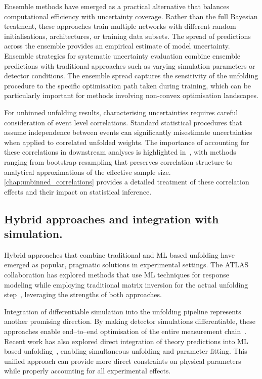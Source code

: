     Ensemble methods have emerged as a practical alternative that balances computational efficiency with uncertainty coverage.
    Rather than the full Bayesian treatment, these approaches train multiple networks with different random initialisations, architectures, or training data subsets.
    The spread of predictions across the ensemble provides an empirical estimate of model uncertainty.
    Ensemble strategies for systematic uncertainty evaluation combine ensemble predictions with traditional approaches such as varying simulation parameters or detector conditions.
    The ensemble spread captures the sensitivity of the unfolding procedure to the specific optimisation path taken during training, which can be particularly important for methods involving non-convex optimisation landscapes.

    For unbinned unfolding results, characterising uncertainties requires careful consideration of event level correlations.
    Standard statistical procedures that assume independence between events can significantly misestimate uncertainties when applied to correlated unfolded weights.
     The importance of accounting for these correlations in downstream analyses is highlighted in~\cite{Desai:2025mpy}, with methods ranging from bootstrap resampling that preserves correlation structure to analytical approximations of the effective sample size.
    \cref{chap:unbinned_correlations} provides a detailed treatment of these correlation effects and their impact on statistical inference.

\subsection{Hybrid approaches and integration with simulation.}

    Hybrid approaches that combine traditional and ML based unfolding have emerged as popular, pragmatic solutions in experimental settings.
    The ATLAS collaboration has explored methods that use ML techniques for response modeling while employing traditional matrix inversion for the actual unfolding step~\cite{GraphNeuralNetwork2022}, leveraging the strengths of both approaches.
    
    Integration of differentiable simulation into the unfolding pipeline represents another promising direction.
    By making detector simulations differentiable, these approaches enable end--to--end optimisation of the entire measurement chain~\cite{MODE:2022znx,newburyReviewDifferentiableSimulators2024}.
    Recent work has also explored direct integration of theory predictions into ML based unfolding~\cite{Huetsch:2024quz}, enabling simultaneous unfolding and parameter fitting.
    This unified approach can provide more direct constraints on physical parameters while properly accounting for all experimental effects.

